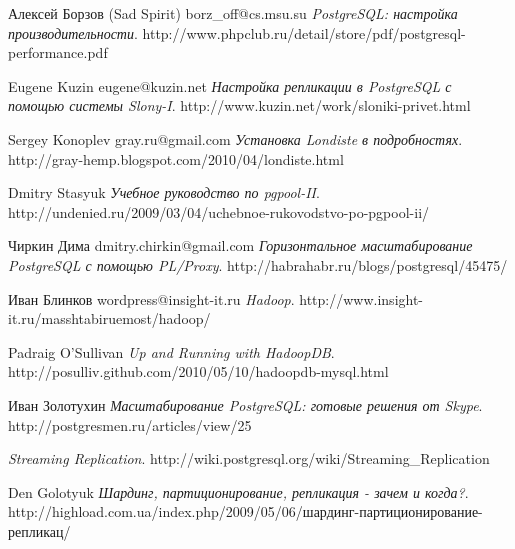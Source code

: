 \renewcommand\bibname{Литература}

\begin{thebibliography}{9}

  Алексей Борзов (Sad Spirit) borz\_off@cs.msu.su
  \emph{PostgreSQL: настройка производительности}.
  http://www.phpclub.ru/detail/store/pdf/postgresql-performance.pdf
  
  Eugene Kuzin eugene@kuzin.net
  \emph{Настройка репликации в PostgreSQL с помощью системы Slony-I}.
  http://www.kuzin.net/work/sloniki-privet.html
  
  Sergey Konoplev gray.ru@gmail.com
  \emph{Установка Londiste в подробностях}.
  http://gray-hemp.blogspot.com/2010/04/londiste.html

  Dmitry Stasyuk
  \emph{Учебное руководство по pgpool-II}.
  http://undenied.ru/2009/03/04/uchebnoe-rukovodstvo-po-pgpool-ii/
  
  Чиркин Дима dmitry.chirkin@gmail.com
  \emph{Горизонтальное масштабирование PostgreSQL с помощью PL/Proxy}.
  http://habrahabr.ru/blogs/postgresql/45475/
  
  Иван Блинков wordpress@insight-it.ru
  \emph{Hadoop}.
  http://www.insight-it.ru/masshtabiruemost/hadoop/

  Padraig O'Sullivan
  \emph{Up and Running with HadoopDB}.
  http://posulliv.github.com/2010/05/10/hadoopdb-mysql.html
  
  Иван Золотухин
  \emph{Масштабирование PostgreSQL: готовые решения от Skype}.
  http://postgresmen.ru/articles/view/25

  \emph{Streaming Replication}.
  http://wiki.postgresql.org/wiki/Streaming\_Replication
  
  Den Golotyuk
  \emph{Шардинг, партиционирование, репликация - зачем и когда?}.
  http://highload.com.ua/index.php/2009/05/06/шардинг-партиционирование-репликац/

\end{thebibliography}